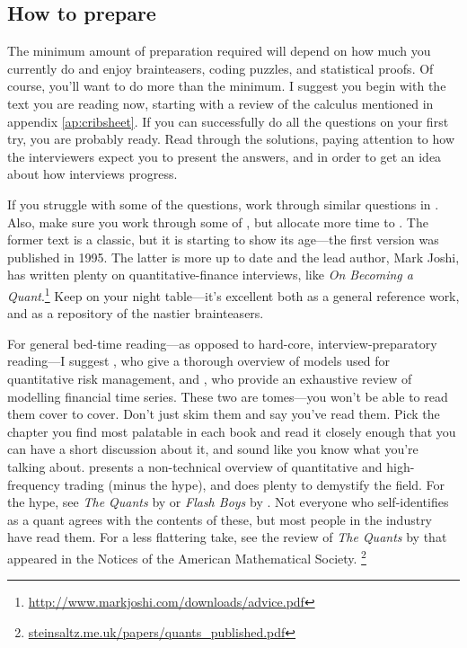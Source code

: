 \documentclass[a4paper]{article}
\begin{document}
{}
\subsection*{How to prepare}

The minimum amount of preparation required will depend on how much you currently do and enjoy brainteasers, coding puzzles, and statistical proofs.
Of course, you'll want to do more than the minimum.
I suggest you begin with the text you are reading now, starting with a review of the calculus mentioned in appendix \ref{ap:cribsheet}.
If you can successfully do all the questions on your first try, you are probably ready.
Read through the solutions, paying attention to how the interviewers expect you to present the answers, and in order to get an idea about how interviews progress.

If you struggle with some of the questions, work through similar questions in \citep{JoshiQA}.
Also, make sure you work through some of \citet{HeardOnTheStreet}, but allocate more time to \citet{JoshiQA}.
The former text is a classic, but it is starting to show its age---the first version was published in 1995.
The latter is more up to date and the lead author, Mark Joshi, has written plenty on quantitative-finance interviews, like
\emph{On Becoming a Quant}.\footnote{\url{http://www.markjoshi.com/downloads/advice.pdf}}
Keep \citet{WilmottFAQ} on your night table---it's excellent both as a general reference work, and as a repository of the nastier brainteasers.

For general bed-time reading---as opposed to hard-core, interview-preparatory reading---I suggest
\citet{mcneil2015quantitative}, who give a thorough overview of models used for quantitative risk management, and
\citet{andersen2009handbook}, who provide an exhaustive review of modelling financial time series.
These two are tomes---you won't be able to read them cover to cover.
Don't just skim them and say you've read them.
Pick the chapter you find most palatable in each book and read it
closely enough that you can have a short discussion about it, and sound like you know what you're talking about.
\citet{narang2013inside} presents a non-technical overview of quantitative and high-frequency trading (minus the hype), and does plenty to demystify the field.
For the hype, see
\emph{The Quants} by \citet{patterson2010quants}
or
\emph{Flash Boys} by \citet{lewis2014flash}.
Not everyone who self-identifies as a quant agrees with the contents of these, but most people in the industry have read them.
For a less flattering take, see the review of \emph{The Quants} by \citet{steinsaltz2011value} that appeared in the Notices of the American Mathematical Society.%
\footnote{\url{steinsaltz.me.uk/papers/quants_published.pdf}}
\end{document}
